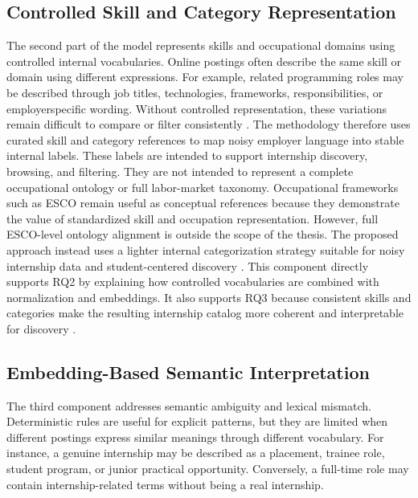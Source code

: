 \subsection{Controlled Skill and Category Representation}

The second part of the model represents skills and occupational domains using controlled internal vocabularies.
Online postings often describe the same skill or domain using different expressions. For example, related
programming roles may be described through job titles, technologies, frameworks, responsibilities, or employerspecific wording. Without controlled representation, these variations remain difficult to compare or filter
consistently \cite{peterson2001occupational, senger2024deep}.
The methodology therefore uses curated skill and category references to map noisy employer language into
stable internal labels. These labels are intended to support internship discovery, browsing, and filtering. They
are not intended to represent a complete occupational ontology or full labor-market taxonomy.
Occupational frameworks such as ESCO remain useful as conceptual references because they demonstrate the
value of standardized skill and occupation representation. However, full ESCO-level ontology alignment is
outside the scope of the thesis. The proposed approach instead uses a lighter internal categorization strategy
suitable for noisy internship data and student-centered discovery \cite{esco2024, staab2009handbook, shvaiko2013ontology}.
This component directly supports RQ2 by explaining how controlled vocabularies are combined with
normalization and embeddings. It also supports RQ3 because consistent skills and categories make the resulting
internship catalog more coherent and interpretable for discovery \cite{zhang2024nnose}.

\subsection{Embedding-Based Semantic Interpretation}

The third component addresses semantic ambiguity and lexical mismatch. Deterministic rules are useful for
explicit patterns, but they are limited when different postings express similar meanings through different
vocabulary. For instance, a genuine internship may be described as a placement, trainee role, student program,
or junior practical opportunity. Conversely, a full-time role may contain internship-related terms without being a
real internship.

